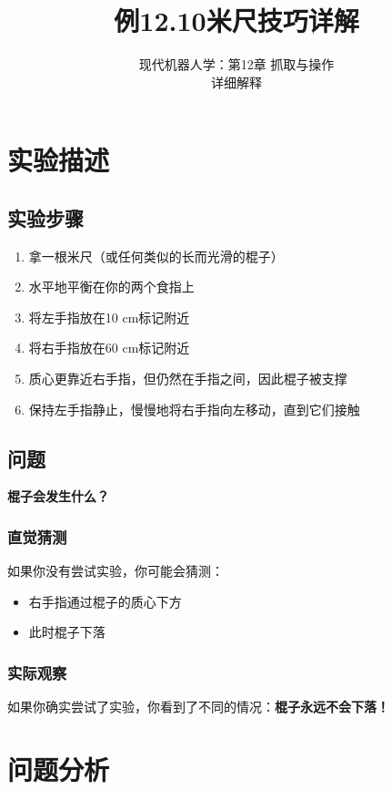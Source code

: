 \documentclass[12pt,a4paper]{article}
\title{例12.10\quad 米尺技巧\quad 详解}
\author{现代机器人学：第12章 抓取与操作\\
详细解释}
\date{}
\begin{document}
\maketitle

\section{实验描述}

\subsection{实验步骤}

\begin{enumerate}
    \item 拿一根米尺（或任何类似的长而光滑的棍子）
    \item 水平地平衡在你的两个食指上
    \item 将左手指放在10 cm标记附近
    \item 将右手指放在60 cm标记附近
    \item 质心更靠近右手指，但仍然在手指之间，因此棍子被支撑
    \item 保持左手指静止，慢慢地将右手指向左移动，直到它们接触
\end{enumerate}

\subsection{问题}

\textbf{棍子会发生什么？}

\subsubsection{直觉猜测}

如果你没有尝试实验，你可能会猜测：
\begin{itemize}
    \item 右手指通过棍子的质心下方
    \item 此时棍子下落
\end{itemize}

\subsubsection{实际观察}

如果你确实尝试了实验，你看到了不同的情况：\textbf{棍子永远不会下落！}

\section{问题分析}
\end{document}
